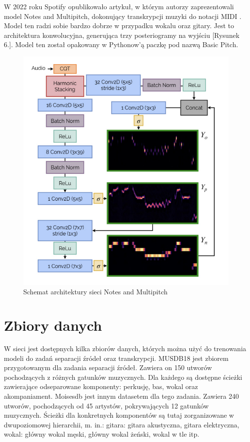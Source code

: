 \documentclass{article}
\begin{document}
W 2022 roku Spotify opublikowało artykuł, w którym autorzy zaprezentowali model Notes and Multipitch, dokonujący transkrypcji muzyki do notacji MIDI \cite{bittner2022lightweight}. Model ten radzi sobie bardzo dobrze w przypadku wokalu oraz gitary. Jest to architektura konwolucyjna, generująca trzy posteriogramy na wyjściu [Rysunek 6.]. Model ten został opakowany w Pythonow'ą paczkę pod nazwą Basic Pitch. 

\begin{figure}[h!]
\centering
\includegraphics[width=0.75\linewidth]{notes_and_multipitch.png}
\caption{\label{fig:unet}Schemat architektury sieci Notes and Multipitch}
\end{figure}

\section{Zbiory danych}
W sieci jest dostępnych kilka zbiorów danych, których można użyć do trenowania modeli do zadań separacji źródeł oraz transkrypcji. MUSDB18 \cite{MUSDB18} jest zbiorem przygotowanym dla zadania separacji źródeł. Zawiera on 150 utworów pochodzących z różnych gatunków muzycznych. Dla każdego są dostępne ścieżki zawierające odseparowane komponenty: perkusję, bas, wokal oraz akompaniament. Moisesdb \cite{pereira2023moisesdb} jest innym datasetem dla tego zadania. Zawiera 240 utworów, pochodzących od 45 artystów, pokrywających 12 gatunków muzycznych. Ścieżki dla konkretnych komponentów są tutaj zorganizowane w dwupoziomowej hierarchii, m. in.: gitara: gitara akustyczna, gitara elektryczna, wokal: główny wokal męski, główny wokal żeński, wokal w tle itp.\\
\end{document}
